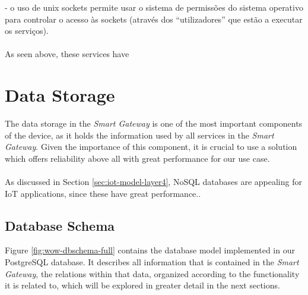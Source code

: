 - o uso de unix sockets permite usar o sistema de permissões do sistema operativo para controlar o acesso às sockets (através dos ``utilizadores'' que estão a executar os serviços).

\paragraph{} As seen above, these services have 

\section{Data Storage}

The data storage in the \textit{Smart Gateway} is one of the most important components of the device, as it holds the information used by all services in the \textit{Smart Gateway}. Given the importance of this component, it is crucial to use a solution which offers reliability above all with great performance for our use case.  

\paragraph{} As discussed in Section \ref{sec:iot-model-layer4}, No\acs{SQL} databases are appealing for \acs{IoT} applications, since these have great performance..



\subsection{Database Schema}
Figure \ref{fig:wow-dbschema-full} contains the database model implemented in our PostgreSQL database. It describes all information that is contained in the \textit{Smart Gateway}, the relations within that data, organized according to the functionality it is related to, which will be explored in greater detail in the next sections.


